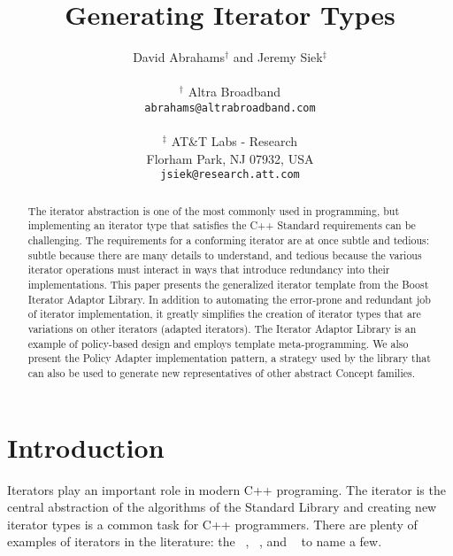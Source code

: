 \documentclass{netobjectdays}
\begin{document}
\title{Generating Iterator Types}

\author{David Abrahams$^\dag$ and Jeremy Siek$^\ddag$ \\
\\
$^\dag$ Altra Broadband \\
\texttt{abrahams@altrabroadband.com}\\
\\
$^\ddag$ AT\&T Labs - Research \\
Florham Park, NJ 07932, USA \\
\texttt{jsiek@research.att.com}
}

\maketitle

\begin{abstract}

The iterator abstraction is one of the most commonly used in
programming, but implementing an iterator type that satisfies the C++
Standard requirements can be challenging. The requirements for a
conforming iterator are at once subtle and tedious: subtle because
there are many details to understand, and tedious because the various
iterator operations must interact in ways that introduce redundancy
into their implementations. This paper presents the generalized
iterator template from the Boost Iterator Adaptor Library. In addition
to automating the error-prone and redundant job of iterator
implementation, it greatly simplifies the creation of iterator types
that are variations on other iterators (adapted iterators). The
Iterator Adaptor Library is an example of policy-based design and
employs template meta-programming. We also present the Policy Adapter
implementation pattern, a strategy used by the library that can also
be used to generate new representatives of other abstract Concept
families.
\end{abstract}


\section{Introduction}


Iterators play an important role in modern C++ programing. The
iterator is the central abstraction of the algorithms of the Standard
Library and creating new iterator types is a common task for C++
programmers. There are plenty of examples of iterators in the
literature: the
~\cite{austern99:_gener_progr_stl},
~\cite{koenig97:_rumin_cpp},
 and
~\cite{iso98:_cpp_final_draft_standard}
to name a few.
\end{document}
